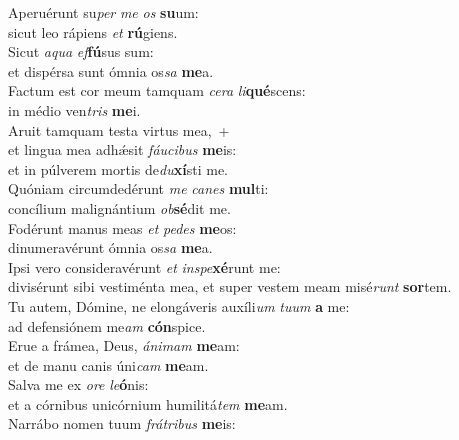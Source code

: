 \oddverse Aperuérunt su\textit{per} \textit{me} \textit{os} \textbf{su}um:~\*\\
\oddverse sicut leo rápiens \textit{et} \textbf{rú}giens.\\
\evenverse Sicut \textit{a}\textit{qua} \textit{ef}\textbf{fú}sus sum:~\*\\
\evenverse et dispérsa sunt ómnia os\textit{sa} \textbf{me}a.\\
\oddverse Factum est cor meum tamquam \textit{ce}\textit{ra} \textit{li}\textbf{qué}scens:~\*\\
\oddverse in médio ven\textit{tris} \textbf{me}i.\\
\evenverse Aruit tamquam testa virtus mea,~+\\
\evenverse  et lingua mea adhǽsit \textit{fáu}\textit{ci}\textit{bus} \textbf{me}is:~\*\\
\evenverse et in púlverem mortis de\textit{du}\textbf{xí}sti me.\\
\oddverse Quóniam circumdedérunt \textit{me} \textit{ca}\textit{nes} \textbf{mul}ti:~\*\\
\oddverse concílium malignántium \textit{ob}\textbf{sé}dit me.\\
\evenverse Fodérunt manus meas \textit{et} \textit{pe}\textit{des} \textbf{me}os:~\*\\
\evenverse dinumeravérunt ómnia os\textit{sa} \textbf{me}a.\\
\oddverse Ipsi vero consideravérunt \textit{et} \textit{in}\textit{spe}\textbf{xé}runt me:~\*\\
\oddverse divisérunt sibi vestiménta mea, et super vestem meam misé\textit{runt} \textbf{sor}tem.\\
\evenverse Tu autem, Dómine, ne elongáveris auxíli\textit{um} \textit{tu}\textit{um} \textbf{a} me:~\*\\
\evenverse ad defensiónem me\textit{am} \textbf{cón}spice.\\
\oddverse Erue a frámea, Deus, \textit{á}\textit{ni}\textit{mam} \textbf{me}am:~\*\\
\oddverse et de manu canis úni\textit{cam} \textbf{me}am.\\
\evenverse Salva me ex \textit{o}\textit{re} \textit{le}\textbf{ó}nis:~\*\\
\evenverse et a córnibus unicórnium humilitá\textit{tem} \textbf{me}am.\\
\oddverse Narrábo nomen tuum \textit{frá}\textit{tri}\textit{bus} \textbf{me}is:~\*\\
